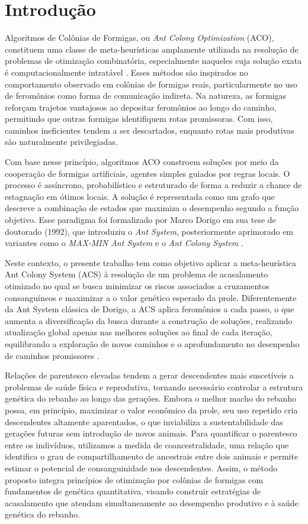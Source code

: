 \section{Introdução}
Algoritmos de Colônias de Formigas, ou \textit{Ant Colony Optimization} (ACO), constituem uma classe de meta-heurísticas amplamente utilizada na resolução de problemas de otimização combinatória, especialmente naqueles cuja solução exata é computacionalmente intratável \cite{dorigo2018introduction}. Esses métodos são inspirados no comportamento observado em colônias de formigas reais, particularmente no uso de feromônios como forma de comunicação indireta. Na natureza, as formigas reforçam trajetos vantajosos ao depositar feromônios ao longo do caminho, permitindo que outras formigas identifiquem rotas promissoras. Com isso, caminhos ineficientes tendem a ser descartados, enquanto rotas mais produtivas são naturalmente privilegiadas.

Com base nesse princípio, algoritmos ACO constroem soluções por meio da cooperação de formigas artificiais, agentes simples guiados por regras locais. O processo é assíncrono, probabilístico e estruturado de forma a reduzir a chance de estagnação em ótimos locais. A solução é representada como um grafo que descreve a combinação de estados que maximiza o desempenho segundo a função objetivo. Esse paradigma foi formalizado por Marco Dorigo em sua tese de doutorado (1992), que introduziu o \textit{Ant System}, posteriormente aprimorado em variantes como o \textit{MAX-MIN Ant System} \cite{stutzle2000max} e o \textit{Ant Colony System} \cite{dorigo2002ant}.

Neste contexto, o presente trabalho tem como objetivo aplicar a meta-heurística Ant Colony System (ACS) à resolução de um problema de acasalamento otimizado no qual se busca minimizar os riscos associados a cruzamentos consanguíneos e maximizar a o valor genético esperado da prole. Diferentemente da Ant System clássica de Dorigo, a ACS aplica feromônios a cada passo, o que aumenta a diversificação da busca durante a construção de soluções, realizando atualização global apenas nas melhores soluções ao final de cada iteração, equilibrando a exploração de novos caminhos e o aprofundamento no desenpenho de caminhos promissores \cite{dorigo2002ant}.

Relações de parentesco elevadas tendem a gerar descendentes mais suscetíveis a problemas de saúde física e reprodutiva, tornando necessário controlar a estrutura genética do rebanho ao longo das gerações. Embora o melhor macho do rebanho possa, em princípio, maximizar o valor econômico da prole, seu uso repetido cria descendentes altamente aparentados, o que inviabiliza a sustentabilidade das gerações futuras sem introdução de novos animais. Para quantificar o parentesco entre os indivíduos, utilizamos a medida de coancestralidade, uma relação que identifica o grau de compartilhamento de ancestrais entre dois animais e permite estimar o potencial de consanguinidade nos descendentes. Assim, o método proposto integra princípios de otimização por colônias de formigas com fundamentos de genética quantitativa, visando construir estratégias de acasalamento que atendam simultaneamente ao desempenho produtivo e à saúde genética do rebanho.